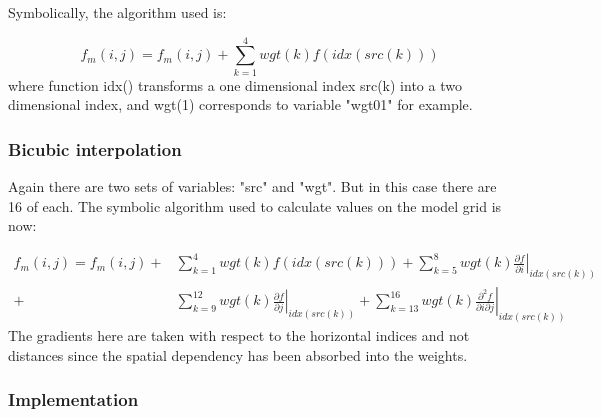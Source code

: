 \documentclass[../tex_main/NEMO_manual]{subfiles}
\begin{document}
Symbolically, the algorithm used is:

\begin{equation}
f_{m}(i,j) = f_{m}(i,j) + \sum_{k=1}^{4} {wgt(k)f(idx(src(k)))}
\end{equation}
where function idx() transforms a one dimensional index src(k) into a two dimensional index,
and wgt(1) corresponds to variable "wgt01" for example.

\subsubsection{Bicubic interpolation}
\label{subsec:SBC_iof_bicubic}

Again there are two sets of variables: "src" and "wgt".
But in this case there are 16 of each.
The symbolic algorithm used to calculate values on the model grid is now:

\begin{equation*} \begin{split}
f_{m}(i,j) =  f_{m}(i,j) +& \sum_{k=1}^{4} {wgt(k)f(idx(src(k)))}     
              +   \sum_{k=5}^{8} {wgt(k)\left.\frac{\partial f}{\partial i}\right| _{idx(src(k))} }    \\
              +& \sum_{k=9}^{12} {wgt(k)\left.\frac{\partial f}{\partial j}\right| _{idx(src(k))} }   
              +   \sum_{k=13}^{16} {wgt(k)\left.\frac{\partial ^2 f}{\partial i \partial j}\right| _{idx(src(k))} }
\end{split}
\end{equation*}
The gradients here are taken with respect to the horizontal indices and not distances since the spatial dependency has been absorbed into the weights.

\subsubsection{Implementation}
\label{subsec:SBC_iof_imp}
\end{document}
